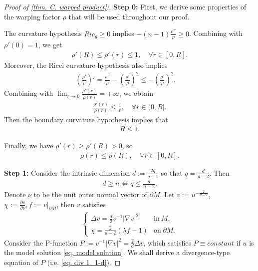\documentclass[12pt]{amsart}%
\numberwithin{equation}{section}
\numberwithin{lemma}{section}
\numberwithin{proposition}{section}
\numberwithin{corollary}{section}
\numberwithin{remark}{section}
\begin{document}
\begin{proof}[Proof of \cref{thm. C. warped product}:] 

\textbf{Step 0:} First, we derive some properties of the warping factor $\rho$ that will be used throughout our proof.

The curvature hypothesis $Ric_g\geq 0$ implies 
        $-(n-1)\frac{\rho''}{\rho}\geq 0$.
        Combining with $\rho'(0)=1$, we get 
        \begin{align}\label{ineq. rho prime r}
            \rho'(R)
            \leq \rho'(r)
            \leq  1,\quad 
            \forall r\in[0,R].
        \end{align}
        Moreover, the Ricci curvature hypothesis also implies
        \begin{align*}
        (\frac{\rho'}{\rho})'=\frac{\rho''}{\rho}
        -(\frac{\rho'}{\rho})^2
        \leq -(\frac{\rho'}{\rho})^2,\quad 
    \end{align*}
   Combining with $\lim_{r\to 0}\frac{\rho'(r)}{\rho(r)}=+\infty$, we obtain
    \begin{align*}
        \frac{\rho'(r)}{\rho(r)}\leq \frac{1}{r},
        \quad 
        \forall r\in(0,R].
    \end{align*}
    Then the boundary curvature hypothesis implies that 
    \begin{align}\label{ineq. R leq 1}
        R\leq 1.
    \end{align}

    Finally, we have $\rho'(r)\geq \rho'(R)>0$, so 
    \begin{align}\label{ineq. rho r leq rho R}
        \rho(r)\leq \rho(R),\quad 
        \forall r\in[0,R].
    \end{align}

\textbf{Step 1:}    Consider the intrinsic dimension $d:=\frac{2q}{q-1}$ so that $q=\frac{d}{d-2}$. Then 
\begin{align*}
    d\geq n\Leftrightarrow q\leq \frac{n}{n-2}.
\end{align*}
Denote  $\nu$ to be the unit outer normal vector of $\partial M$.  Let  $v:=u^{-\frac{2}{d-2}}$, $\chi:=\frac{\partial v}{\partial \nu}, f:=v|_{\partial M}$, then $v$ satisfies
    \begin{align}\label{eq. PDE of v on warped}
        \begin{cases}
            \Delta v=\frac{d}{2}v^{-1}|\nabla v|^2 &\mathrm{in}\ M,\\
            \chi=\frac{2}{d-2}(\lambda f-1) &\mathrm{on}\ \partial M.
        \end{cases}
    \end{align}
    Consider the P-function $P:=v^{-1}|\nabla v|^2=\frac{2}{d}\Delta v$, which satisfies $P\equiv constant$ if $u$ is the model solution \cref{eq. model solution}. We shall derive a divergence-type equation of $P$ (i.e. \cref{eq. div 1_1-d}).


\end{proof}
\end{document}

